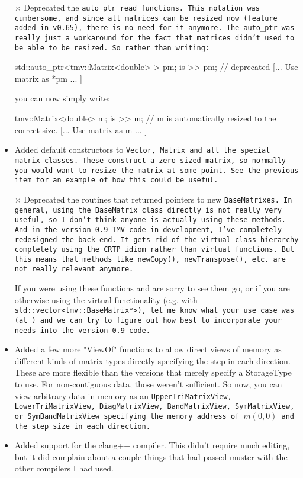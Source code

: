 \begin{itemize}
\item[$\times$]
Deprecated the \tt{auto_ptr} read functions.  This notation was cumbersome, and since 
all matrices can be resized now (feature added in v0.65), there is no need for it anymore.
The \tt{auto_ptr} was really just a workaround for the fact that matrices didn't used to be 
able to be resized.  So rather than writing:
\begin{tmvcode}
std::auto_ptr<tmv::Matrix<double> > pm;
is >> pm;  // deprecated
[... Use matrix as *pm ... ]
\end{tmvcode}
you can now simply write:
\begin{tmvcode}
tmv::Matrix<double> m;
is >> m;   // m is automatically resized to the correct size.
[... Use matrix as m ... ]
\end{tmvcode}

\item
Added default constructors to \tt{Vector}, \tt{Matrix} and all the special matrix classes.
These construct a zero-sized matrix, so normally you would want to resize the matrix at 
some point.  See the previous item for an example of how this could be useful.

\item[$\times$] 
Deprecated the routines that returned pointers to new \tt{BaseMatrix}es.  In general, using the \tt{BaseMatrix} class directly is not really very useful, so I don't think anyone is actually using these methods.  And in the version 0.9 TMV code in development, I've completely redesigned the back end.  It gets rid of the virtual class hierarchy completely using the CRTP idiom rather than virtual functions.  But this means that methods like \tt{newCopy()}, \tt{newTranspose()}, etc. are not really relevant anymore.  

If you were using these functions and are sorry to see them go, or if you are otherwise using the virtual functionality (e.g. with \tt{std::vector<tmv::BaseMatrix*>}), let me know what your use case was (at \mygroup) and we can try to figure out how best to incorporate your needs into the version 0.9 code.

\item 
Added a few more "ViewOf" functions to allow direct views of memory as different kinds of matrix types directly specifying the step in each direction.  These are more flexible than the versions that merely specify a StorageType to use.  For non-contiguous data, those weren't sufficient.  So now, you can view arbitrary data in memory as an \tt{UpperTriMatrixView}, \tt{LowerTriMatrixView},
\tt{DiagMatrixView}, \tt{BandMatrixView}, \tt{SymMatrixView}, or \tt{SymBandMatrixView} specifying the memory address of $m(0,0)$ and the step size in each direction.

\item 
Added support for the clang++ compiler.  This didn't require much editing, but it did complain about a couple things that had passed muster with the other compilers I had used.



\end{itemize}
